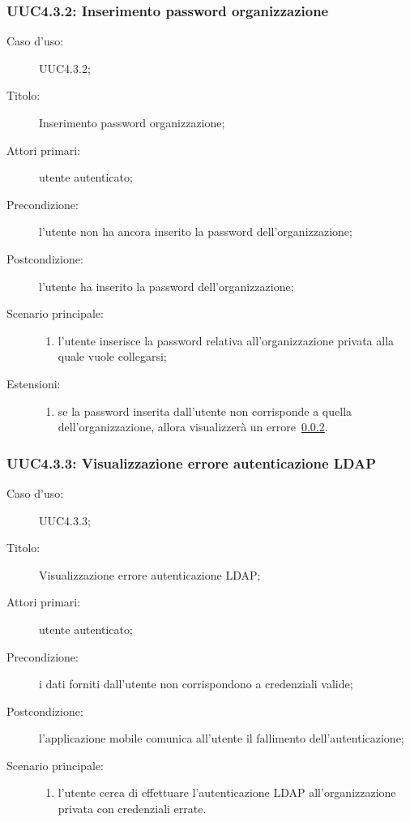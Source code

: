 \documentclass[../../../analisi-dei-requisiti.tex]{subfiles}
\begin{document}
\subsubsection{UUC4.3.2: Inserimento password organizzazione}%
\label{subs:UUC4.3.2}
\begin{description}
  \item[Caso d’uso:] UUC4.3.2;
  \item[Titolo:] Inserimento password organizzazione;
  \item[Attori primari:] utente autenticato;
  \item[Precondizione:] l'utente non ha ancora inserito la password dell'organizzazione;
  \item[Postcondizione:] l'utente ha inserito la password dell'organizzazione;
  \item[Scenario principale:]
        \begin{enumerate}
          \item l'utente inserisce la password relativa all'organizzazione privata alla quale vuole collegarsi;
        \end{enumerate}
  \item[Estensioni:]
        \begin{enumerate}
          \item se la password inserita dall'utente non corrisponde a quella dell'organizzazione, allora visualizzerà un errore~\ref{subs:UUC4.3.3}.
        \end{enumerate}
\end{description}

\subsubsection{UUC4.3.3: Visualizzazione errore autenticazione LDAP}%
\label{subs:UUC4.3.3}
\begin{description}
  \item[Caso d’uso:] UUC4.3.3;
  \item[Titolo:] Visualizzazione errore autenticazione LDAP\@;
  \item[Attori primari:] utente autenticato;
  \item[Precondizione:] i dati forniti dall'utente non corrispondono a credenziali valide;
  \item[Postcondizione:] l'applicazione mobile comunica all'utente il fallimento dell'autenticazione;
  \item[Scenario principale:]
        \begin{enumerate}
          \item l'utente cerca di effettuare l'autenticazione LDAP all'organizzazione privata con credenziali errate.
        \end{enumerate}
\end{description}
\end{document}
